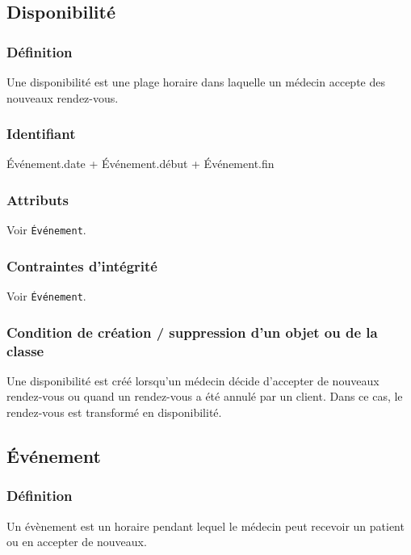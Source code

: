 \documentclass[a4paper, 11pt]{report}
\begin{document}
\subsection{Disponibilité}

\subsubsection{Définition}

Une disponibilité est une plage horaire dans laquelle un médecin accepte
des nouveaux rendez-vous.

\subsubsection{Identifiant}

Événement.date + Événement.début + Événement.fin

\subsubsection{Attributs}

Voir \texttt{Événement}.

\subsubsection{Contraintes d'intégrité}

Voir \texttt{Événement}.

\subsubsection{Condition de création / suppression d'un objet ou de la classe}

Une disponibilité est créé lorsqu'un médecin décide d'accepter de nouveaux rendez-vous ou quand un
rendez-vous a été annulé par un client. Dans ce cas, le rendez-vous est transformé en disponibilité.

\subsection{Événement}

\subsubsection{Définition}

Un évènement est un horaire pendant lequel le médecin peut recevoir un patient ou en accepter de nouveaux.
\end{document}
